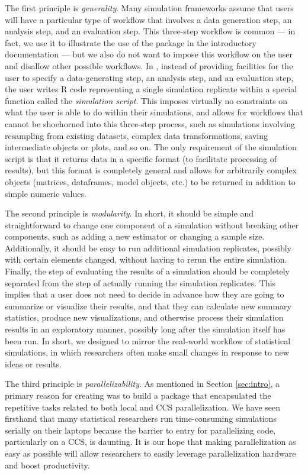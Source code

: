 The first principle is \textit{generality}. Many simulation frameworks assume that users will have a particular type of workflow that involves a data generation step, an analysis step, and an evaluation step. This three-step workflow is common --- in fact, we use it to illustrate the use of the package in the introductory documentation --- but we also do not want to impose this workflow on the user and disallow other possible workflows. In , instead of providing facilities for the user to specify a data-generating step, an analysis step, and an evaluation step, the user writes R code representing a single simulation replicate within a special function called the \textit{simulation script}. This imposes virtually no constraints on what the user is able to do within their simulations, and allows for workflows that cannot be shoehorned into this three-step process, such as simulations involving resampling from existing datasets, complex data transformations, saving intermediate objects or plots, and so on. The only requirement of the simulation script is that it returns data in a specific format (to facilitate processing of results), but this format is completely general and allows for arbitrarily complex objects (matrices, dataframes, model objects, etc.) to be returned in addition to simple numeric values.

The second principle is \textit{modularity}. In short, it should be simple and straightforward to change one component of a simulation without breaking other components, such as adding a new estimator or changing a sample size. Additionally, it should be easy to run additional simulation replicates, possibly with certain elements changed, without having to rerun the entire simulation. Finally, the step of evaluating the results of a simulation should be completely separated from the step of actually running the simulation replicates. This implies that a user does not need to decide in advance how they are going to summarize or visualize their results, and that they can calculate new summary statistics, produce new visualizations, and otherwise process their simulation results in an exploratory manner, possibly long after the simulation itself has been run. In short, we designed  to mirror the real-world workflow of statistical simulations, in which researchers often make small changes in response to new ideas or results.

The third principle is \textit{parallelizability}. As mentioned in Section \ref{sec:intro}, a primary reason for creating  was to build a package that encapsulated the repetitive tasks related to both local and CCS parallelization. We have seen firsthand that many statistical researchers run time-consuming simulations serially on their laptops because the barrier to entry for parallelizing code, particularly on a CCS, is daunting. It is our hope that making parallelization as easy as possible will allow researchers to easily leverage parallelization hardware and boost productivity.

